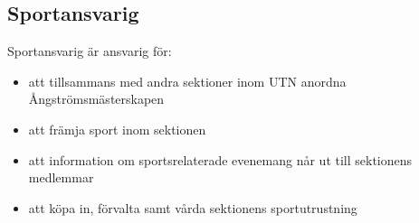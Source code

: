 \documentclass[a4paper]{article}
\begin{document}
  \subsection{Sportansvarig}
  Sportansvarig är ansvarig för:

  \begin{itemize}
    \item att tillsammans med andra sektioner inom UTN anordna Ångströmsmästerskapen
    \item att främja sport inom sektionen
    \item att information om sportsrelaterade evenemang når ut till sektionens  medlemmar
    \item att köpa in, förvalta samt vårda sektionens sportutrustning
  \end{itemize}
\end{document}
